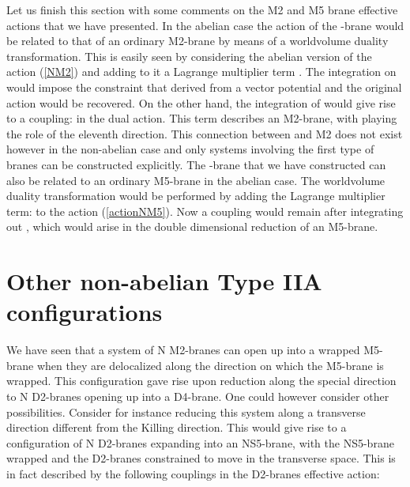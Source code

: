\documentclass[12pt,a4paper]{article}
\begin{document}
Let us finish this section with some comments on the M2 and M5 brane
effective actions that we have presented.
In the abelian case the action of the \coordHE{}-brane would be related to
that of an ordinary M2-brane by means of a worldvolume duality
transformation. This is easily seen by 
considering the abelian version of the action (\ref{NM2})
and adding to it a Lagrange multiplier term
\coordHE{}. The integration
on \coordHE{} would impose
the constraint that \coordHE{} derived from a vector potential
and the original action would be recovered. On the other hand, the
integration of \coordHE{} would give rise to a coupling:
\coordHE{}
in the dual action. This term describes an M2-brane, with
\coordHE{} playing the role of the eleventh direction. 
This connection between \coordHE{} and M2 does not exist however in the
non-abelian case and only systems involving the first type of branes
can be constructed explicitly.
The \coordHE{}-brane that we have constructed
can also be related to an ordinary M5-brane in the abelian case.
The worldvolume duality transformation would be performed
by adding the Lagrange multiplier term:
\coordHE{}
to the action (\ref{actionNM5}).
Now a coupling \coordHE{} would remain after integrating out
\coordHE{}, which would arise in the double
dimensional reduction of an M5-brane. 



\section{Other non-abelian Type IIA configurations}

We have seen that a system of N M2-branes
can open up into a wrapped M5-brane when they are delocalized along
the direction on which the M5-brane is wrapped.
This configuration gave rise upon reduction along the special
direction to N D2-branes opening up into a D4-brane. One could
however consider other possibilities. Consider for instance reducing 
this system along a transverse direction different
from the Killing direction.
This would give rise to a configuration of N D2-branes expanding into
an NS5-brane, with the NS5-brane wrapped and the
D2-branes constrained to move in the transverse space. 
This is in fact described by the following couplings in the D2-branes
effective action:
\end{document}
